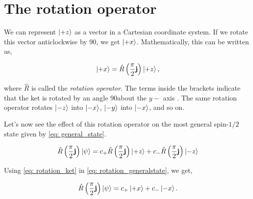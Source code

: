 \section{The rotation operator}
We  can represent $\ket{+z}$ as a vector in a Cartesian coordinate
system. If we rotate this vector anticlockwise by 90\degree, we get
$\ket{+x}$. Mathematically, this can be written as,

\begin{equation}
\ket{+x} = \hat R \left(\frac{\pi}{2} \mathbf{j} \right) \ket{+z},
\label{eq: rotation_ket}
\end{equation}

where $\hat R$ is called the \emph{rotation operator}. The terms inside the
brackets indicate that the ket is rotated by an angle 90\degree about the $y-$
axis . The same rotation operator
rotates $\ket{-z}$ into $\ket{-x}$, $\ket{-y}$ into $\ket{-x}$, and so on.

Let's now see the effect of this rotation operator on the most general spin-$1/2$
state given by \cref{eq: general_state}.

\begin{equation}
	\hat R \left(\frac{\pi}{2} \mathbf{j} \right) \ket{\psi} = 
	c_{+} \hat R \left(\frac{\pi}{2} \mathbf{j} \right) \ket{+z}
       + c_{-} \hat R \left(\frac{\pi}{2} \mathbf{j} \right) \ket{-z}
	\label{eq: rotation_generalstate}
\end{equation}

Using \cref{eq: rotation_ket} in \cref{eq: rotation_generalstate}, we get,

\begin{equation}
\hat R \left(\frac{\pi}{2} \mathbf{j} \right) \ket{\psi} = 
	c_{+} \ket{+x} + c_{-} \ket{-x}.
\end{equation}

